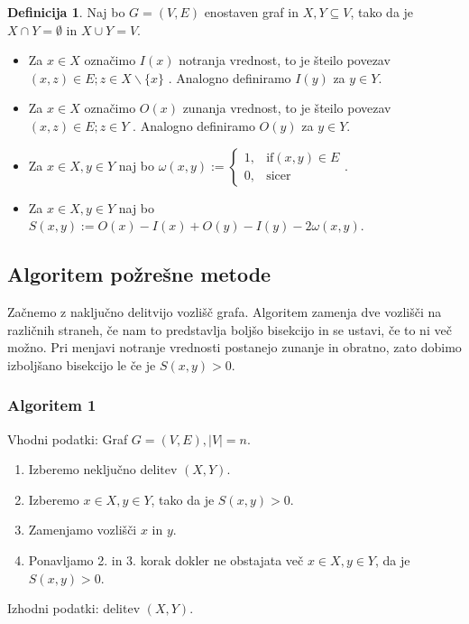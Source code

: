 \documentclass[12pt,a4paper]{amsart}
\theoremstyle{definition} %
\newtheorem{definicija}{Definicija}[section]
\theoremstyle{plain} %
\begin{document}
\begin{definicija}
Naj bo $G=(V,E)$ enostaven graf in $X,Y \subseteq V$, tako da je $X \cap Y = \emptyset$ in $X \cup Y =V$.
\begin{itemize}
\item Za $x \in X$ označimo $I(x)$ notranja vrednost, to je šteilo povezav $(x,z) \in E;z\in X \backslash \{x\}$ . Analogno definiramo $I(y)$ za $y \in Y$.
\item Za $x \in X$ označimo $O(x)$ zunanja vrednost, to je šteilo povezav $(x,z) \in E;z\in Y $ . Analogno definiramo $O(y)$ za $y \in Y$.
\item Za $x \in X, y \in Y$ naj bo $\omega(x,y) := \begin{cases} 1,&\text{if} (x,y) \in E\\ 
0, &\text{sicer}\end{cases} $.
\item Za $x \in X, y \in Y$ naj bo $S(x,y):= O(x)-I(x)+O(y)-I(y)-2\omega(x,y)$.
\end{itemize}
\end{definicija}

\subsection{Algoritem požrešne metode}
Začnemo z naključno delitvijo vozlišč grafa. Algoritem zamenja dve vozlišči na različnih straneh, če nam to predstavlja boljšo bisekcijo in se ustavi, če to ni več možno. Pri menjavi notranje vrednosti postanejo zunanje in obratno, zato dobimo izboljšano bisekcijo le če je $S(x,y)>0$.
\subsubsection{Algoritem 1} 
Vhodni podatki: Graf $G=(V,E), |V|=n$.
\begin{enumerate}
\item Izberemo neključno delitev $(X,Y)$.
\item Izberemo $x\in X, y\in Y$, tako da je $S(x,y)>0$.
\item Zamenjamo vozlišči $x$ in $y$.
\item Ponavljamo 2. in 3. korak dokler ne obstajata več $x\in X, y\in Y$, da je $S(x,y)>0$.
\end{enumerate}
Izhodni podatki: delitev $(X,Y)$.
\end{document}

